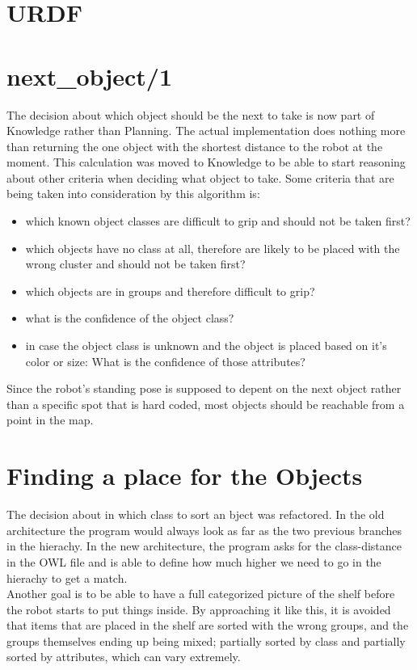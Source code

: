 \documentclass[main.tex]{subfiles}
\begin{document}
		\section{URDF}


		\section{next\_object/1}
		The decision about which object should be the next to take is now part of Knowledge rather than Planning. The actual implementation does nothing more than returning the one object with the shortest distance to the robot at the moment. This calculation was moved to Knowledge to be able to start reasoning about other criteria when deciding what object to take. Some criteria that are being taken into consideration by this algorithm is:
		
\begin{itemize}
\item which known object classes are difficult to grip and should not be taken first?
\item which objects have no class at all, therefore are likely to be placed with the wrong cluster and should not be taken first?
\item which objects are in groups and therefore difficult to grip?
\item what is the confidence of the object class?
\item in case the object class is unknown and the object is placed based on it's color or size: What is the confidence of those attributes?
\end{itemize}

Since the robot's standing pose is supposed to depent on the next object rather than a specific spot that is hard coded, most objects should be reachable from a point in the map. 

		\section{Finding a place for the Objects}
		The decision about in which class to sort an bject was refactored. In the old architecture the program would always look as far as the two previous branches in the hierachy. In the new architecture, the program asks for the class-distance in the OWL file and is able to define how much higher we need to go in the hierachy to get a match.\\
Another goal is to be able to have a full categorized picture of the shelf before the robot starts to put things inside. By approaching it like this, it is avoided that items that are placed in the shelf are sorted with the wrong groups, and the groups themselves ending up being mixed; partially sorted by class and partially sorted by attributes, which can vary extremely.
 
\end{document}
